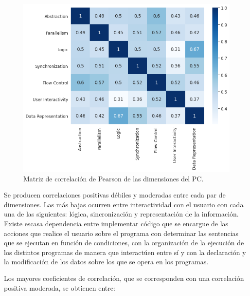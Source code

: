 \documentclass[a4paper, 12pt]{book}
\begin{document}
\begin{figure}[H]
    \centering
    \includegraphics[width=.7\textwidth]{img/corr_Scratch.png}
    \caption{Matriz de correlación de Pearson de las dimensiones del PC.}\label{fig:corr_Scratch}
\end{figure}

Se producen correlaciones positivas débiles y moderadas entre cada par de dimensiones. Las más bajas ocurren entre interactividad con el usuario con cada una de las siguientes: lógica, sincronización y representación de la información. Existe escasa dependencia entre implementar código que se encargue de las acciones que realice el usuario sobre el programa con determinar las sentencias que se ejecutan en función de condiciones, con la organización de la ejecución de los distintos programas de manera que interactúen entre sí y con la declaración y la modificación de los datos sobre los que se opera en los programas.

Los mayores coeficientes de correlación, que se corresponden con una correlación positiva moderada, se obtienen entre:
\end{document}
